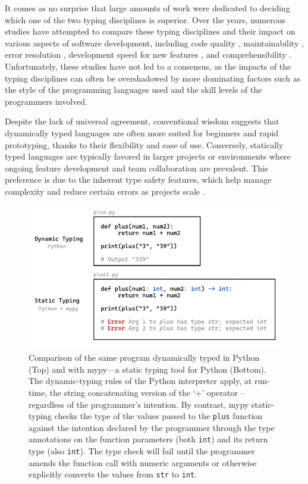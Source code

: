 It comes as no surprise that large amounts of work were dedicated to deciding which one of the two typing disciplines is superior. Over the years, numerous studies have attempted to compare these typing disciplines and their impact on various aspects of software development, including code quality \cite{Ray2017-gq, Gao2017-xn}, maintainability \cite{Kleinschmager2012-bg}, error resolution \cite{Prechelt1998-pd}, development speed for new features \cite{Prechelt2000-bf, Mayer2012-ko}, and comprehensibility \cite{Endrikat2014-uz}. Unfortunately, these studies have not led to a consensus, as the impacts of the typing disciplines can often be overshadowed by more dominating factors such as the style of the programming languages used and the skill levels of the programmers involved.

Despite the lack of universal agreement, conventional wisdom suggests that dynamically typed languages are often more suited for beginners and rapid prototyping, thanks to their flexibility and ease of use. Conversely, statically typed languages are typically favored in larger projects or environments where ongoing feature development and team collaboration are prevalent. This preference is due to the inherent type safety features, which help manage complexity and reduce certain errors as projects scale \cite{Chatley2019-uq}.


\begin{figure}[ht]
  \centering
  \includegraphics[width=\linewidth]{TypedVsUntyped.pdf}
  \caption[Comparison of the same program dynamically typed in Python and with mypy—a static typing tool for Python]{
    \label{fig:typed-vs-untyped}
    Comparison of the same program dynamically typed in Python (Top) and with mypy—a static typing tool for Python (Bottom).  The dynamic-typing rules of the Python interpreter apply, at run-time, the string concatenating version of the `+' operator -- regardless of the programmer's intention.  By contrast, mypy static-typing checks the type of the values passed to the {\tt plus} function against the intention declared by the programmer through the type annotations on the function parameters (both {\tt int}) and its return type (also {\tt int}).  The type check will fail until the programmer amends the function call with numeric arguments or otherwise explicitly converts the values from {\tt str} to {\tt int}.
    }
\end{figure}



